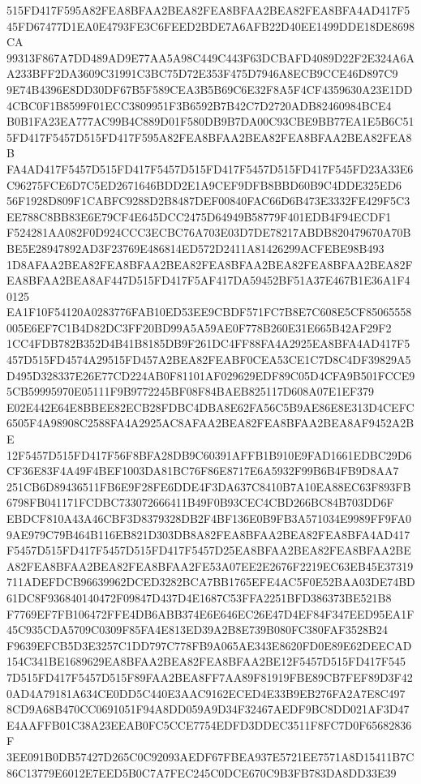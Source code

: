 \documentclass[UTF8,fontset=fandol,zihao=-4,a4paper]{ctexart}
\begin{document}
{{515FD417F595A82FEA8BFAA2BEA82FEA8BFAA2BEA82FEA8BFA4AD417F545FD67477D1EA0E4793FE3C6FEED2BDE7A6AFB22D40EE1499DDE18DE8698CA
99313F867A7DD489AD9E77AA5A98C449C443F63DCBAFD4089D22F2E324A6AA233BFF2DA3609C31991C3BC75D72E353F475D7946A8ECB9CCE46D897C9
9E74B4396E8DD30DF67B5F589CEA3B5B69C6E32F8A5F4CF4359630A23E1DD4CBC0F1B8599F01ECC3809951F3B6592B7B42C7D2720ADB82460984BCE4
B0B1FA23EA777AC99B4C889D01F580DB9B7DA00C93CBE9BB77EA1E5B6C515FD417F5457D515FD417F595A82FEA8BFAA2BEA82FEA8BFAA2BEA82FEA8B
FA4AD417F5457D515FD417F5457D515FD417F5457D515FD417F545FD23A33E6C96275FCE6D7C5ED2671646BDD2E1A9CEF9DFB8BBD60B9C4DDE325ED6
56F1928D809F1CABFC9288D2B8487DEF00840FAC66D6B473E3332FE429F5C3EE788C8BB83E6E79CF4E645DCC2475D64949B58779F401EDB4F94ECDF1
F524281AA082F0D924CCC3ECBC76A703E03D7DE78217ABDB820479670A70BBE5E28947892AD3F23769E486814ED572D2411A81426299ACFEBE98B493
1D8AFAA2BEA82FEA8BFAA2BEA82FEA8BFAA2BEA82FEA8BFAA2BEA82FEA8BFAA2BEA8AF447D515FD417F5AF417DA59452BF51A37E467B1E36A1F40125
EA1F10F54120A0283776FAB10ED53EE9CBDF571FC7B8E7C608E5CF85065558005E6EF7C1B4D82DC3FF20BD99A5A59AE0F778B260E31E665B42AF29F2
1CC4FDB782B352D4B41B8185DB9F261DC4FF88FA4A2925EA8BFA4AD417F5457D515FD4574A29515FD457A2BEA82FEABF0CEA53CE1C7D8C4DF39829A5
D495D328337E26E77CD224AB0F81101AF029629EDF89C05D4CFA9B501FCCE95CB59995970E05111F9B9772245BF08F84BAEB825117D608A07E1EF379
E02E442E64E8BBEE82ECB28FDBC4DBA8E62FA56C5B9AE86E8E313D4CEFC6505F4A98908C2588FA4A2925AC8AFAA2BEA82FEA8BFAA2BEA8AF9452A2BE
12F5457D515FD417F56F8BFA28DB9C60391AFFB1B910E9FAD1661EDBC29D6CF36E83F4A49F4BEF1003DA81BC76F86E8717E6A5932F99B6B4FB9D8AA7
251CB6D89436511FB6E9F28FE6DDE4F3DA637C8410B7A10EA88EC63F893FB6798FB041171FCDBC733072666411B49F0B93CEC4CBD266BC84B703DD6F
EBDCF810A43A46CBF3D8379328DB2F4BF136E0B9FB3A571034E9989FF9FA09AE979C79B464B116EB821D303DB8A82FEA8BFAA2BEA82FEA8BFA4AD417
F5457D515FD417F5457D515FD417F5457D25EA8BFAA2BEA82FEA8BFAA2BEA82FEA8BFAA2BEA82FEA8BFAA2FE53A07EE2E2676F2219EC63EB45E37319
711ADEFDCB96639962DCED3282BCA7BB1765EFE4AC5F0E52BAA03DE74BD61DC8F936840140472F09847D437D4E1687C53FFA2251BFD386373BE521B8
F7769EF7FB106472FFE4DB6ABB374E6E646EC26E47D4EF84F347EED95EA1F45C935CDA5709C0309F85FA4E813ED39A2B8E739B080FC380FAF3528B24
F9639EFCB5D3E3257C1DD797C778FB9A065AE343E8620FD0E89E62DEECAD154C341BE1689629EA8BFAA2BEA82FEA8BFAA2BE12F5457D515FD417F545
7D515FD417F5457D515F89FAA2BEA8FF7AA89F81919FBE89CB7FEF89D3F420AD4A79181A634CE0DD5C440E3AAC9162ECED4E33B9EB276FA2A7E8C497
8CD9A68B470CC0691051F94A8DD059A9D34F32467AEDF9BC8DD021AF3D47E4AAFFB01C38A23EEAB0FC5CCE7754EDFD3DDEC3511F8FC7D0F65682836F
3EE091B0DB57427D265C0C92093AEDF67FBEA937E5721EE7571A8D15411B7C86C13779E6012E7EED5B0C7A7FEC245C0DCE670C9B3FB783DA8DD33E39
}}
\end{document}
